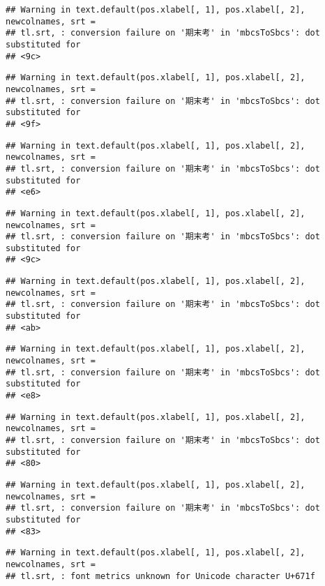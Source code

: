 \documentclass[
]{book}
\begin{document}
\begin{verbatim}
## Warning in text.default(pos.xlabel[, 1], pos.xlabel[, 2], newcolnames, srt =
## tl.srt, : conversion failure on '期末考' in 'mbcsToSbcs': dot substituted for
## <9c>
\end{verbatim}

\begin{verbatim}
## Warning in text.default(pos.xlabel[, 1], pos.xlabel[, 2], newcolnames, srt =
## tl.srt, : conversion failure on '期末考' in 'mbcsToSbcs': dot substituted for
## <9f>
\end{verbatim}

\begin{verbatim}
## Warning in text.default(pos.xlabel[, 1], pos.xlabel[, 2], newcolnames, srt =
## tl.srt, : conversion failure on '期末考' in 'mbcsToSbcs': dot substituted for
## <e6>
\end{verbatim}

\begin{verbatim}
## Warning in text.default(pos.xlabel[, 1], pos.xlabel[, 2], newcolnames, srt =
## tl.srt, : conversion failure on '期末考' in 'mbcsToSbcs': dot substituted for
## <9c>
\end{verbatim}

\begin{verbatim}
## Warning in text.default(pos.xlabel[, 1], pos.xlabel[, 2], newcolnames, srt =
## tl.srt, : conversion failure on '期末考' in 'mbcsToSbcs': dot substituted for
## <ab>
\end{verbatim}

\begin{verbatim}
## Warning in text.default(pos.xlabel[, 1], pos.xlabel[, 2], newcolnames, srt =
## tl.srt, : conversion failure on '期末考' in 'mbcsToSbcs': dot substituted for
## <e8>
\end{verbatim}

\begin{verbatim}
## Warning in text.default(pos.xlabel[, 1], pos.xlabel[, 2], newcolnames, srt =
## tl.srt, : conversion failure on '期末考' in 'mbcsToSbcs': dot substituted for
## <80>
\end{verbatim}

\begin{verbatim}
## Warning in text.default(pos.xlabel[, 1], pos.xlabel[, 2], newcolnames, srt =
## tl.srt, : conversion failure on '期末考' in 'mbcsToSbcs': dot substituted for
## <83>
\end{verbatim}

\begin{verbatim}
## Warning in text.default(pos.xlabel[, 1], pos.xlabel[, 2], newcolnames, srt =
## tl.srt, : font metrics unknown for Unicode character U+671f
\end{verbatim}
\end{document}

